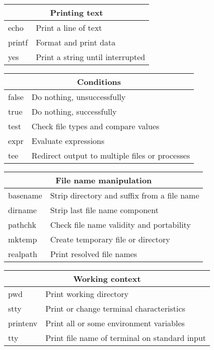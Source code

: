 \begin{tabularx}{0.75\textwidth}{|l|X|}
\hline
\multicolumn{2}{|c|}{Printing text}\\ \hline
echo  &               Print a line of text\\
printf  &             Format and print data\\
yes  &                Print a string until interrupted\\
\hline
\end{tabularx}

\begin{tabularx}{0.75\textwidth}{|l|X|}
\hline
\multicolumn{2}{|c|}{Conditions}\\ \hline
false  &              Do nothing, unsuccessfully\\
true  &               Do nothing, successfully\\
test  &               Check file types and compare values\\
expr  &               Evaluate expressions\\
tee  &                Redirect output to multiple files or processes\\
\hline
\end{tabularx}

\begin{tabularx}{0.75\textwidth}{|l|X|}
\hline
\multicolumn{2}{|c|}{File name manipulation}\\ \hline
basename  &           Strip directory and suffix from a file name\\
dirname  &            Strip last file name component\\
pathchk  &            Check file name validity and portability\\
mktemp  &             Create temporary file or directory\\
realpath  &           Print resolved file names\\
\hline
\end{tabularx}

\begin{tabularx}{0.75\textwidth}{|l|X|}
\hline
\multicolumn{2}{|c|}{Working context}\\ \hline
pwd  &                Print working directory\\
stty  &               Print or change terminal characteristics\\
printenv  &           Print all or some environment variables\\
tty  &                Print file name of terminal on standard input\\
\hline
\end{tabularx}

